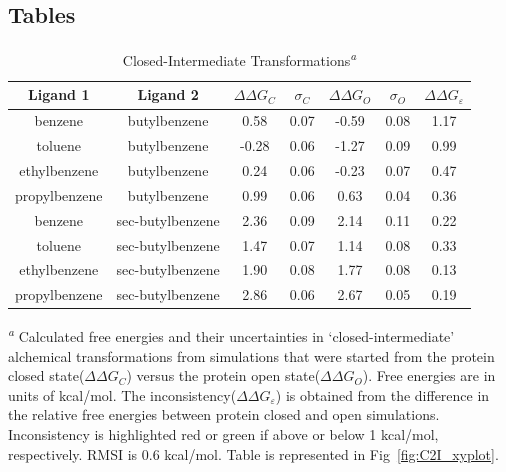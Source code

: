 \newpage
\subsection{Tables}

\begin{table}[!htb]
\centering
\caption{Closed-Intermediate Transformations\textsuperscript{\emph{a}}}
\label{tbl:C-I}
\begin{tabular}{|c|c|c|c|c|c|c|}
\hline
\textbf{Ligand 1}   & \textbf{Ligand 2}    & \boldmath$\Delta\Delta G_{C}$ & \boldmath$\sigma_{C}$ & \boldmath$\Delta\Delta G_{O}$ & \boldmath$\sigma_{O}$ & \boldmath$\Delta\Delta G_{\varepsilon}$            \\ \hline
benzene         & butylbenzene   & 0.58    & 0.07  & -0.59  & 0.08  & \cellcolor[HTML]{FFCCC9}1.17 \\ \hline
toluene         & butylbenzene   & -0.28   & 0.06  & -1.27  & 0.09  & \cellcolor[HTML]{9AFF99}0.99 \\ \hline
ethylbenzene    & butylbenzene   & 0.24    & 0.06  & -0.23  & 0.07  & \cellcolor[HTML]{9AFF99}0.47 \\ \hline
propylbenzene & butylbenzene   & 0.99    & 0.06  & 0.63   & 0.04  & \cellcolor[HTML]{9AFF99}0.36 \\ \hline
benzene         & sec-butylbenzene & 2.36    & 0.09  & 2.14   & 0.11  & \cellcolor[HTML]{9AFF99}0.22 \\ \hline
toluene         & sec-butylbenzene & 1.47    & 0.07  & 1.14   & 0.08  & \cellcolor[HTML]{9AFF99}0.33 \\ \hline
ethylbenzene    & sec-butylbenzene & 1.90    & 0.08  & 1.77   & 0.08  & \cellcolor[HTML]{9AFF99}0.13 \\ \hline
propylbenzene & sec-butylbenzene & 2.86    & 0.06  & 2.67   & 0.05  & \cellcolor[HTML]{9AFF99}0.19 \\ \hline
\end{tabular}

\textsuperscript{\emph{a}} Calculated free energies and their uncertainties in `closed-intermediate' alchemical transformations from simulations that were started from the protein closed state(\boldmath$\Delta\Delta G_{C}$) versus the protein open state(\boldmath$\Delta\Delta G_{O}$).
Free energies are in units of kcal/mol. 
The inconsistency(\boldmath$\Delta\Delta G_{\varepsilon}$) is obtained from the difference in the relative free energies between protein closed and open simulations. 
Inconsistency is highlighted red or green if above or below 1 kcal/mol, respectively.
RMSI is 0.6 kcal/mol.
Table is represented in Fig~\ref{fig:C2I_xyplot}.
\end{table}


